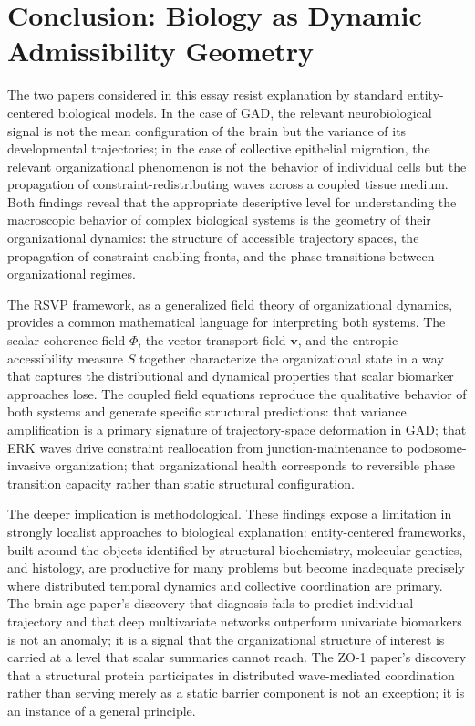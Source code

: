\documentclass[11pt,a4paper]{article}
\theoremstyle{plain}
\theoremstyle{definition}
\begin{document}
\section{Conclusion: Biology as Dynamic Admissibility Geometry}
\label{sec:conclusion}

The two papers considered in this essay resist explanation by standard entity-centered
biological models. In the case of GAD, the relevant neurobiological signal is not the
mean configuration of the brain but the variance of its developmental trajectories;
in the case of collective epithelial migration, the relevant organizational phenomenon
is not the behavior of individual cells but the propagation of constraint-redistributing
waves across a coupled tissue medium. Both findings reveal that the appropriate
descriptive level for understanding the macroscopic behavior of complex biological
systems is the geometry of their organizational dynamics: the structure of accessible
trajectory spaces, the propagation of constraint-enabling fronts, and the phase
transitions between organizational regimes.

The RSVP framework, as a generalized field theory of organizational dynamics, provides
a common mathematical language for interpreting both systems. The scalar coherence
field $\Phi$, the vector transport field $\mathbf{v}$, and the entropic accessibility
measure $S$ together characterize the organizational state in a way that captures
the distributional and dynamical properties that scalar biomarker approaches lose.
The coupled field equations reproduce the qualitative behavior of both systems and
generate specific structural predictions: that variance amplification is a primary
signature of trajectory-space deformation in GAD; that ERK waves drive constraint
reallocation from junction-maintenance to podosome-invasive organization; that
organizational health corresponds to reversible phase transition capacity rather
than static structural configuration.

The deeper implication is methodological. These findings expose a limitation in
strongly localist approaches to biological explanation: entity-centered frameworks,
built around the objects identified by structural biochemistry, molecular genetics, and
histology, are productive for many problems but become inadequate precisely where
distributed temporal dynamics and collective coordination are primary. The brain-age
paper's discovery that diagnosis fails to predict individual trajectory and that deep
multivariate networks outperform univariate biomarkers is not an anomaly; it is a signal
that the organizational structure of interest is carried at a level that scalar summaries
cannot reach. The ZO-1 paper's discovery that a structural protein participates in
distributed wave-mediated coordination rather than serving merely as a static barrier
component is not an exception; it is an instance of a general principle.
\end{document}
